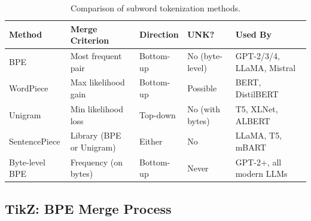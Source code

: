 \begin{table}[H]
\centering
\small
\begin{tabularx}{\textwidth}{@{}l l l l X@{}}
\toprule
\textbf{Method} & \textbf{Merge Criterion} & \textbf{Direction} & \textbf{UNK?} & \textbf{Used By} \\
\midrule
BPE              & Most frequent pair        & Bottom-up & No (byte-level)  & GPT-2/3/4, LLaMA, Mistral \\
WordPiece        & Max likelihood gain       & Bottom-up & Possible         & BERT, DistilBERT \\
Unigram          & Min likelihood loss        & Top-down  & No (with bytes)  & T5, XLNet, ALBERT \\
SentencePiece    & Library (BPE or Unigram)  & Either    & No               & LLaMA, T5, mBART \\
Byte-level BPE   & Frequency (on bytes)       & Bottom-up & Never            & GPT-2+, all modern LLMs \\
\bottomrule
\end{tabularx}
\caption{Comparison of subword tokenization methods.}
\label{tab:tokenizer_comparison}
\end{table}

\subsection{TikZ: BPE Merge Process}

